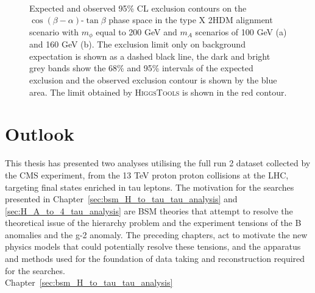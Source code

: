 \begin{figure}[!hbtp]
\centering
     \\
\caption{Expected and observed 95\% CL exclusion contours on the $\cos(\beta-\alpha)$-$\tan\beta$ phase space in the type X 2HDM alignment scenario with $m_{\phi}$ equal to 200 GeV and $m_{A}$ scenarios of 100 GeV (a) and 160 GeV (b). The exclusion limit only on background expectation is shown as a dashed black line, the dark and bright grey bands show the 68\% and 95\% intervals of the expected exclusion and the observed exclusion contour is shown by the blue area. The limit obtained by \textsc{HiggsTools} is shown in the red contour.}
\label{fig:4tau_cosbma_hb}
\end{figure}

\section{Outlook}

This thesis has presented two analyses utilising the full run 2 dataset collected by the \ac{CMS} experiment, from the 13 TeV proton proton collisions at the \ac{LHC}, targeting final states enriched in tau leptons.
The motivation for the searches presented in Chapter~\ref{sec:bsm_H_to_tau_tau_analysis} and \ref{sec:H_A_to_4_tau_analysis} are \ac{BSM} theories that attempt to resolve the theoretical issue of the hierarchy problem and the experiment tensions of the B anomalies and the g-2 anomaly.
The preceding chapters, act to motivate the new physics models that could potentially resolve these tensions, and the apparatus and methods used for the foundation of data taking and reconstruction required for the searches. \\

Chapter~\ref{sec:bsm_H_to_tau_tau_analysis} 